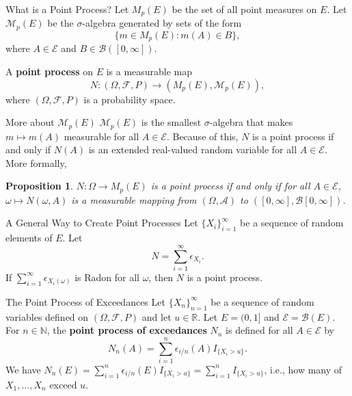 \documentclass{beamer}
\newtheorem{proposition}{Proposition}
\begin{document}
\begin{frame}{What is a Point Process?}
    Let $M_p(E)$ be the set of all point measures on $E$. Let $\mathcal{M}_p(E)$ be the $\sigma$-algebra generated by sets of the form
    \[
    \{m \in M_p(E) : m(A) \in B\},
    \]
    where $A \in \mathcal{E}$ and $B \in \mathcal{B}([0, \infty])$.

    \smallskip

    \begin{definition}
        A \textbf{point process} on $E$ is a measurable map
        \[
        N : (\Omega, \mathcal{F}, P) \to (M_p(E), \mathcal{M}_p(E)),
        \]
        where $(\Omega, \mathcal{F}, P)$ is a probability space.
    \end{definition}
\end{frame}

\begin{frame}{More about $\mathcal{M}_p(E)$}
    $\mathcal{M}_p(E)$ is the smallest $\sigma$-algebra that makes $m \mapsto m(A)$ measurable for all $A \in \mathcal{E}$. Because of this, $N$ is a point process if and only if $N(A)$ is an extended real-valued random variable for all $A \in \mathcal{E}$. More formally,
    \begin{proposition}
    $N : \Omega \to M_p(E)$ is a point process if and only if for all $A \in \mathcal{E}$, $\omega \mapsto N(\omega, A)$ is a measurable mapping from $(\Omega, \mathcal{A})$ to $([0, \infty], \mathcal{B}[0, \infty])$.
    \end{proposition}
\end{frame}

\begin{frame}{A General Way to Create Point Processes}
    Let $\{X_i\}_{i = 1}^{\infty}$ be a sequence of random elements of $E$. Let
    \[
    N = \sum_{i = 1}^{\infty} \epsilon_{X_i}.
    \]
    If $\sum_{i = 1}^{\infty} \epsilon_{X_i(\omega)}$ is Radon for all $\omega$, then $N$ is a point process.
\end{frame}

\begin{frame}{The Point Process of Exceedances}
    Let $\{X_n\}_{n = 1}^{\infty}$ be a sequence of random variables defined on $(\Omega, \mathcal{F}, P)$ and let $u \in \mathbb{R}$. Let $E = (0, 1]$ and $\mathcal{E} = \mathcal{B}(E)$. For $n \in \mathbb{N}$, the \textbf{point process of exceedances} $N_n$ is defined for all $A \in \mathcal{E}$ by
    \[
    N_n(A) = \sum_{i = 1}^n \epsilon_{i / n}(A)I_{\{X_i > u\}}.
    \]
    We have $N_n(E) = \sum_{i = 1}^n \epsilon_{i / n}(E)I_{\{X_i > u\}} = \sum_{i = 1}^n I_{\{X_i > u\}}$, i.e., how many of $X_1, \ldots, X_n$ exceed $u$.
\end{frame}
\end{document}
